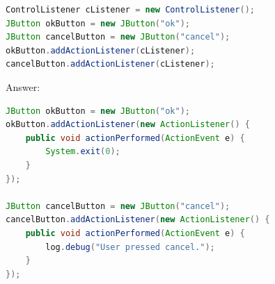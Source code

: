 \documentclass[11pt]{article}
\newenvironment{answer}{\large\lstset{basicstyle=\large\ttfamily}\color{white} \small{Answer:}}{}
\newenvironment{answer}{\large\lstset{basicstyle=\large\ttfamily}\color{red} \small{Answer:}}{}
\begin{document}
\begin{enumerate}
\begin{lstlisting}[language=java]
ControlListener cListener = new ControlListener();
JButton okButton = new JButton("ok");
JButton cancelButton = new JButton("cancel");
okButton.addActionListener(cListener);
cancelButton.addActionListener(cListener);
\end{lstlisting}
\begin{answer}
\begin{lstlisting}[language=java]
JButton okButton = new JButton("ok");
okButton.addActionListener(new ActionListener() {
	public void actionPerformed(ActionEvent e) {
		System.exit(0);
	}
});

JButton cancelButton = new JButton("cancel");
cancelButton.addActionListener(new ActionListener() {
	public void actionPerformed(ActionEvent e) {
		log.debug("User pressed cancel.");
	}
});
\end{lstlisting}
\end{answer}












\end{enumerate}
\end{document}
